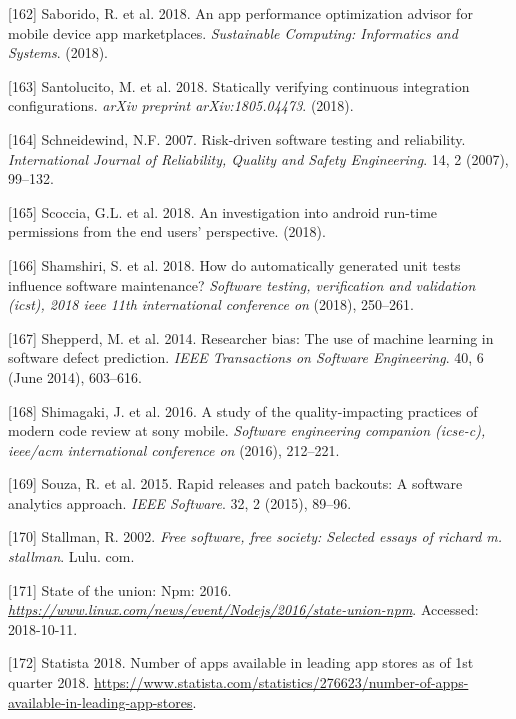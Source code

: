 \documentclass[]{book}
\begin{document}
\hypertarget{ref-SKHA2018}{}
{[}162{]} Saborido, R. et al. 2018. An app performance optimization
advisor for mobile device app marketplaces. \emph{Sustainable Computing:
Informatics and Systems}. (2018).

\hypertarget{ref-santolucito2018statically}{}
{[}163{]} Santolucito, M. et al. 2018. Statically verifying continuous
integration configurations. \emph{arXiv preprint arXiv:1805.04473}.
(2018).

\hypertarget{ref-schneidewind2007}{}
{[}164{]} Schneidewind, N.F. 2007. Risk-driven software testing and
reliability. \emph{International Journal of Reliability, Quality and
Safety Engineering}. 14, 2 (2007), 99--132.

\hypertarget{ref-scoccia2018investigation}{}
{[}165{]} Scoccia, G.L. et al. 2018. An investigation into android
run-time permissions from the end users' perspective. (2018).

\hypertarget{ref-shamshiri2018automatically}{}
{[}166{]} Shamshiri, S. et al. 2018. How do automatically generated unit
tests influence software maintenance? \emph{Software testing,
verification and validation (icst), 2018 ieee 11th international
conference on} (2018), 250--261.

\hypertarget{ref-Shepperd2014}{}
{[}167{]} Shepperd, M. et al. 2014. Researcher bias: The use of machine
learning in software defect prediction. \emph{IEEE Transactions on
Software Engineering}. 40, 6 (June 2014), 603--616.

\hypertarget{ref-shimagaki2016study}{}
{[}168{]} Shimagaki, J. et al. 2016. A study of the quality-impacting
practices of modern code review at sony mobile. \emph{Software
engineering companion (icse-c), ieee/acm international conference on}
(2016), 212--221.

\hypertarget{ref-souza2015a}{}
{[}169{]} Souza, R. et al. 2015. Rapid releases and patch backouts: A
software analytics approach. \emph{IEEE Software}. 32, 2 (2015), 89--96.

\hypertarget{ref-Stallman2002}{}
{[}170{]} Stallman, R. 2002. \emph{Free software, free society: Selected
essays of richard m. stallman}. Lulu. com.

\hypertarget{ref-Linux2016}{}
{[}171{]} State of the union: Npm: 2016.
\emph{\url{https://www.linux.com/news/event/Nodejs/2016/state-union-npm}}.
Accessed: 2018-10-11.

\hypertarget{ref-appNumber}{}
{[}172{]} Statista 2018. Number of apps available in leading app stores
as of 1st quarter 2018.
\url{https://www.statista.com/statistics/276623/number-of-apps-available-in-leading-app-stores}.
\end{document}
